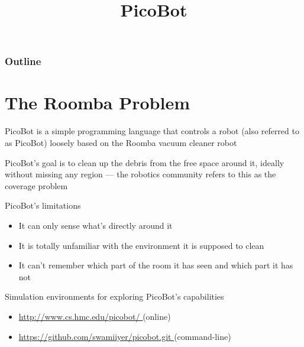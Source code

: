 \documentclass[8pt,a4paper,compress]{beamer}
\title{PicoBot}
\date{}
\begin{document}
\begin{frame}
\vfill
\titlepage
\end{frame}

\begin{frame}
\frametitle{Outline}
\tableofcontents
\end{frame}

\section{The Roomba Problem}
\begin{frame}[fragile]
\pause

PicoBot is a simple programming language that controls a robot (also referred to as PicoBot) loosely based on the Roomba vacuum cleaner robot

\pause
\bigskip

PicoBot's goal is to clean up the debris from the free space around it, ideally without missing any region --- the robotics community refers to this as the coverage problem

\pause
\bigskip

PicoBot's limitations
\begin{itemize}
\item It can only sense what's directly around it

\item It is totally unfamiliar with the environment it is supposed to clean

\item It can't remember which part of the room it has seen and which part it has not
\end{itemize}

\pause
\bigskip

Simulation environments for exploring PicoBot's capabilities
\begin{itemize}
\item \href{http://www.cs.hmc.edu/picobot/}{http://www.cs.hmc.edu/picobot/ \ExternalLink} (online)

\item \href{https://github.com/swamiiyer/picobot.git}{https://github.com/swamiiyer/picobot.git \ExternalLink} (command-line)
\end{itemize}
\end{frame}
\end{document}
